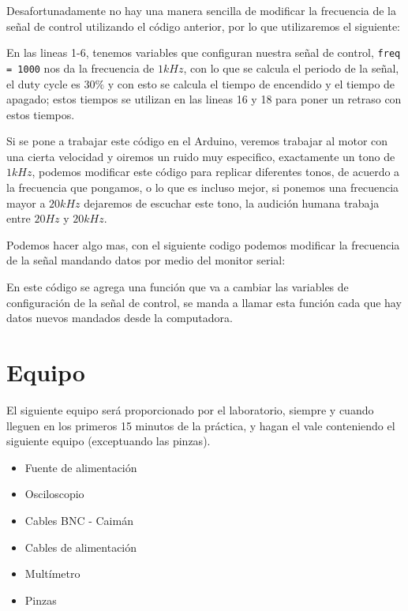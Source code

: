 		Desafortunadamente no hay una manera sencilla de modificar la frecuencia de la señal de control utilizando el código anterior, por lo que utilizaremos el siguiente:
		\newpage

		

		En las lineas 1-6, tenemos variables que configuran nuestra señal de control, \texttt{freq = 1000} nos da la frecuencia de $1kHz$, con lo que se calcula el periodo de la señal, el duty cycle es $30\%$ y con esto se calcula el tiempo de encendido y el tiempo de apagado; estos tiempos se utilizan en las lineas 16 y 18 para poner un retraso con estos tiempos.

		Si se pone a trabajar este código en el Arduino, veremos trabajar al motor con una cierta velocidad y oiremos un ruido muy especifico, exactamente un tono de $1kHz$, podemos modificar este código para replicar diferentes tonos, de acuerdo a la frecuencia que pongamos, o lo que es incluso mejor, si ponemos una frecuencia mayor a $20kHz$ dejaremos de escuchar este tono, la audición humana trabaja entre $20Hz$ y $20kHz$.

		Podemos hacer algo mas, con el siguiente codigo podemos modificar la frecuencia de la señal mandando datos por medio del monitor serial:

		

		En este código se agrega una función que va a cambiar las variables de configuración de la señal de control, se manda a llamar esta función cada que hay datos nuevos mandados desde la computadora.



\section{Equipo}

	El siguiente equipo será proporcionado por el laboratorio, siempre y cuando lleguen en los primeros 15 minutos de la práctica, y hagan el vale conteniendo el siguiente equipo (exceptuando las pinzas).

	\begin{itemize}
		\item Fuente de alimentación
		\item Osciloscopio
		\item Cables BNC - Caimán
		\item Cables de alimentación
		\item Multímetro
		\item Pinzas
	\end{itemize}

